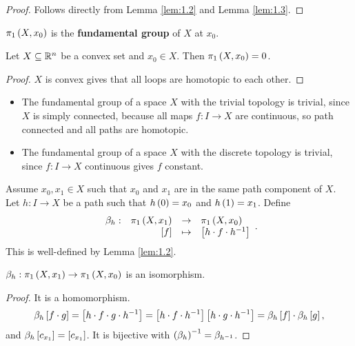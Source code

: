 \begin{proof}
Follows directly from Lemma \ref{lem:1.2} and Lemma \ref{lem:1.3}.
\end{proof}

\begin{definition*}
$ \pi_1\rb{X, x_0} $ is the \textbf{fundamental group} of $ X $ at $ x_0 $.
\end{definition*}

\begin{example*}
Let $ X \subseteq \R^n $ be a convex set and $ x_0 \in X $. Then $ \pi_1\rb{X, x_0} = 0 $.
\end{example*}

\begin{proof}
$ X $ is convex gives that all loops are homotopic to each other.
\end{proof}

\begin{example*}
\hfill
\begin{itemize}
\item The fundamental group of a space $ X $ with the trivial topology is trivial, since $ X $ is simply connected, because all maps $ f : I \to X $ are continuous, so path connected and all paths are homotopic.
\item The fundamental group of a space $ X $ with the discrete topology is trivial, since $ f : I \to X $ continuous gives $ f $ constant.
\end{itemize}
\end{example*}

Assume $ x_0, x_1 \in X $ such that $ x_0 $ and $ x_1 $ are in the same path component of $ X $. Let $ h : I \to X $ be a path such that $ h\rb{0} = x_0 $ and $ h\rb{1} = x_1 $. Define
$$ \function[\beta_h]{\pi_1\rb{X, x_1}}{\pi_1\rb{X, x_0}}{\sb{f}}{\sb{h \cdot f \cdot h^{-1}}}. $$
This is well-defined by Lemma \ref{lem:1.2}.

\begin{proposition}
$ \beta_h : \pi_1\rb{X, x_1} \to \pi_1\rb{X, x_0} $ is an isomorphism.
\end{proposition}

\begin{proof}
It is a homomorphism.
$$ \beta_h\sb{f \cdot g} = \sb{h \cdot f \cdot g \cdot h^{-1}} = \sb{h \cdot f \cdot h^{-1}}\sb{h \cdot g \cdot h^{-1}} = \beta_h\sb{f} \cdot \beta_h\sb{g}, $$
and $ \beta_h\sb{c_{x_1}} = \sb{c_{x_1}} $. It is bijective with $ \rb{\beta_h}^{-1} = \beta_{h^{-1}} $.
\end{proof}

